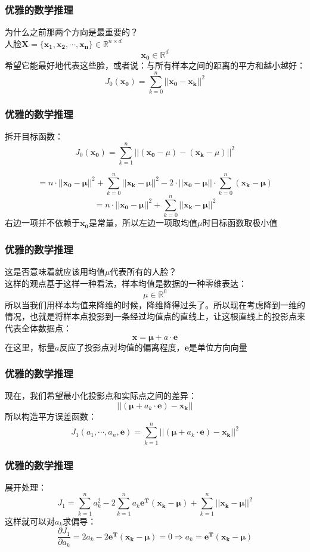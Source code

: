 \documentclass[24pt]{beamer}
\begin{document}
\begin{frame}
\frametitle{优雅的数学推理}
为什么之前那两个方向是最重要的？\\
\bigskip
人脸$\mathbf{X} = \{\mathbf{x_1}, \mathbf{x_2}, \cdots, \mathbf{x_n} \} \in \mathbb{R}^{n \times d}$\\
\[ \mathbf{x_0} \in \mathbb{R}^{d} \]
希望它能最好地代表这些脸，或者说：与所有样本之间的距离的平方和越小越好：
\[ J_0(\mathbf{x_0}) = \sum_{k = 0}^n || \mathbf{x_0} - \mathbf{x_k} ||^2 \]
\end{frame}
\begin{frame}
\frametitle{优雅的数学推理}
拆开目标函数：
\[ J_0(\mathbf{x_0}) = \sum_{k = 1}^n || (\mathbf{x_0} - \mu ) - ( \mathbf{x_k} - \mu ) ||^2 \]

\[  = n\cdot || \mathbf{x_0} - \mathbf{\mu} ||^2 + \sum_{k = 0}^n || \mathbf{x_k} - \mathbf{\mu} ||^2  - 2 \cdot ||\mathbf{x_0} - \mathbf{\mu} || \cdot  \sum_{k = 0}^n ( \mathbf{x_k} - \mathbf{\mu} ) \]
\[  = n \cdot || \mathbf{x_0} - \mathbf{\mu} ||^2 + \sum_{k = 0}^n || \mathbf{x_k} - \mathbf{\mu} ||^2  \]
右边一项并不依赖于$\mathbf{x_0}$是常量，所以左边一项取均值$\mu$时目标函数取极小值
\end{frame}
\begin{frame}
\frametitle{优雅的数学推理}
这是否意味着就应该用均值$\mu$代表所有的人脸？\\
这样的观点基于这样一种看法，样本均值是数据的一种零维表达：\\
\[ \mu \in \mathbb{R}^0 \]
所以当我们用样本均值来降维的时候，降维降得过头了。所以现在考虑降到一维的情况，也就是将样本点投影到一条经过均值点的直线上，让这根直线上的投影点来代表全体数据点：
\[ \mathbf{x} = \mathbf{\mu} + a \cdot \mathbf{e} \]
在这里，标量$a$反应了投影点对均值的偏离程度，$\mathbf{e}$是单位方向向量
\end{frame}
\begin{frame}
\frametitle{优雅的数学推理}
现在，我们希望最小化投影点和实际点之间的差异：
\[ ||(\mathbf{\mu} + a_k \cdot \mathbf{e}) - \mathbf{x_k}|| \]
所以构造平方误差函数：\\
\[ J_1(a_1, \cdots, a_n, \mathbf{e}) = \sum_{k=1}^n ||(\mathbf{\mu} + a_k \cdot \mathbf{e}) - \mathbf{x_k}||^2  \]
\end{frame}
\begin{frame}
\frametitle{优雅的数学推理}
展开处理：
\[ J_1 = \sum_{k=1}^n a_k^2 - 2\sum_{k=1}^n a_k \mathbf{e^T}(\mathbf{x_k - \mu}) + \sum_{k=1}^n ||\mathbf{x_k - \mu}||^2 \]
这样就可以对$a_k$求偏导：\\
\[ \frac{\partial J_1}{\partial a_k} = 2a_k - 2\mathbf{e^T}(\mathbf{x_k - \mu}) = 0 \Rightarrow a_k = \mathbf{e^T}(\mathbf{x_k - \mu}) \]
\end{frame}
\end{document}
